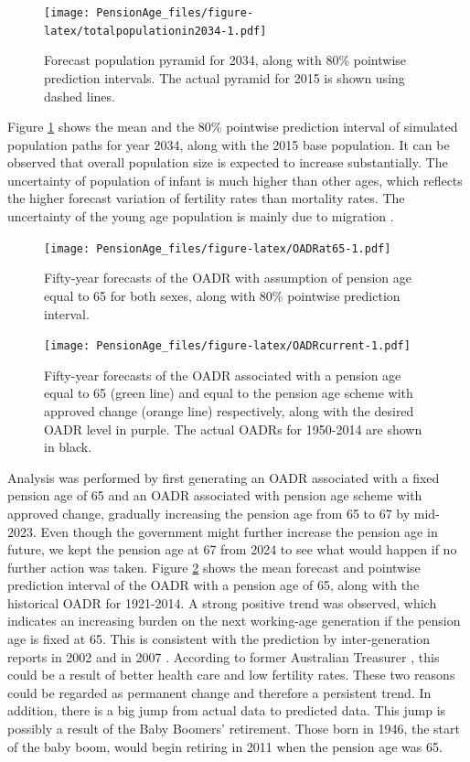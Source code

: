 \documentclass[11pt,a4paper,]{article}
\begin{document}
\begin{figure}
\centering
\texttt{[image: PensionAge\_files/figure-latex/totalpopulationin2034-1.pdf]}
\caption{\label{fig:totalpopulationin2034}Forecast population pyramid for 2034, along with 80\% pointwise prediction intervals. The actual pyramid for 2015 is shown using dashed lines.}
\end{figure}

Figure \ref{fig:totalpopulationin2034} shows the mean and the 80\% pointwise prediction interval of simulated population paths for year 2034, along with the 2015 base population. It can be observed that overall population size is expected to increase substantially. The uncertainty of population of infant is much higher than other ages, which reflects the higher forecast variation of fertility rates than mortality rates. The uncertainty of the young age population is mainly due to migration \autocite{HB08}.

\begin{figure}
\centering
\texttt{[image: PensionAge\_files/figure-latex/OADRat65-1.pdf]}
\caption{\label{fig:OADRat65}Fifty-year forecasts of the OADR with assumption of pension age equal to 65 for both sexes, along with 80\% pointwise prediction interval.}
\end{figure}

\begin{figure}
\centering
\texttt{[image: PensionAge\_files/figure-latex/OADRcurrent-1.pdf]}
\caption{\label{fig:OADRcurrent}Fifty-year forecasts of the OADR associated with a pension age equal to 65 (green line) and equal to the pension age scheme with approved change (orange line) respectively, along with the desired OADR level in purple. The actual OADRs for 1950-2014 are shown in black.}
\end{figure}

Analysis was performed by first generating an OADR associated with a fixed pension age of 65 and an OADR associated with pension age scheme with approved change, gradually increasing the pension age from 65 to 67 by mid-2023. Even though the government might further increase the pension age in future, we kept the pension age at 67 from 2024 to see what would happen if no further action was taken. Figure \ref{fig:OADRat65} shows the mean forecast and pointwise prediction interval of the OADR with a pension age of 65, along with the historical OADR for 1921-2014. A strong positive trend was observed, which indicates an increasing burden on the next working-age generation if the pension age is fixed at 65. This is consistent with the prediction by inter-generation reports in 2002 \autocite{IGR02} and in 2007 \autocite{IGR07}. According to former Australian Treasurer \textcite{Costello04}, this could be a result of better health care and low fertility rates. These two reasons could be regarded as permanent change and therefore a persistent trend. In addition, there is a big jump from actual data to predicted data. This jump is possibly a result of the Baby Boomers' retirement. Those born in 1946, the start of the baby boom, would begin retiring in 2011 when the pension age was 65.
\end{document}
